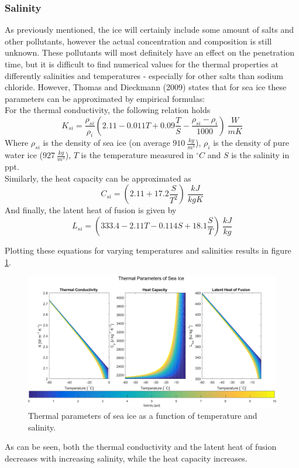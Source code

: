 \subsubsection{Salinity} \label{sec:iceSalinity}
As previously mentioned, the ice will certainly include some amount of salts and other pollutants, however the actual concentration and composition is still unknown. These pollutants will most definitely have an effect on the penetration time, but it is difficult to find numerical values for the thermal properties at differently salinities and temperatures - especially for other salts than sodium chloride. However, Thomas and Dieckmann (2009)\cite{book:thomas2009sea} states that for sea ice these parameters can be approximated by empirical formulas:\\

\noindent
For the thermal conductivity, the following relation holds
\begin{equation}
K_{si}=\frac{\rho_{si}}{\rho_i}\left(2.11 - 0.011 T + 0.09 \frac{T}{S} - \frac{\rho_{si}-\rho_i}{1000}\right)\SI{}{\frac{W}{m K}}
\end{equation}
Where $\rho_{si}$ is the density of sea ice (on average $\SI{910}{\frac{kg}{m^3}}$\cite{article:timco19961}), $\rho_i$ is the density of pure water ice ($\SI{927}{\frac{kg}{m^3}}$), $T$ is the temperature measured in $^\circ C$ and $S$ is the salinity in ppt.\\
Similarly, the heat capacity can be approximated as
\begin{equation}
C_{si} = \left(2.11 + 17.2 \frac{S}{T^2}\right)\SI{}{\frac{kJ}{kg K}}
\end{equation}
And finally, the latent heat of fusion is given by
\begin{equation}
L_{si}=\left(333.4-2.11T-0.114S+18.1\frac{S}{T}\right)\SI{}{\frac{kJ}{kg}}
\end{equation}

\noindent
Plotting these equations for varying temperatures and salinities results in figure \ref{fig:iceSalinity}.
\begin{figure}[ht]
	\centering
	\includegraphics[width=.9\textwidth]{figures/LAMC/salinity}
	\caption{Thermal parameters of sea ice as a function of temperature and salinity.}
	\label{fig:iceSalinity}
\end{figure}
As can be seen, both the thermal conductivity and the latent heat of fusion decreases with increasing salinity, while the heat capacity increases. \\

